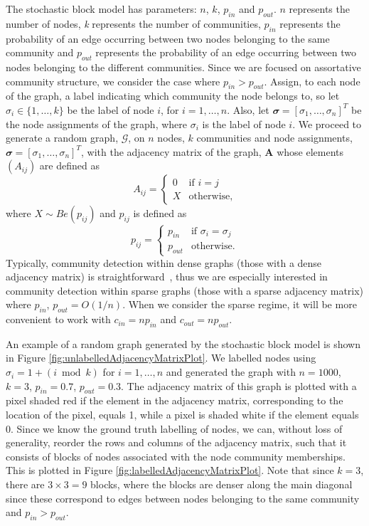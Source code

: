 \documentclass[12pt]{article}
\numberwithin{equation}{section}
\begin{document}
The stochastic block model has parameters: $n$, $k$, $p_{in}$ and $p_{out}$. $n$ represents the number of nodes, \textsl{k} represents the number of communities, $p_{in}$ represents the probability of an edge occurring between two nodes belonging to the same community and $p_{out}$ represents the probability of an edge occurring between two nodes belonging to the different communities. Since we are focused on assortative community structure, we consider the case where $p_{in} > p_{out}$. Assign, to each node of the graph, a label indicating which community the node belongs to, so let $\sigma_{i} \in \{1,\dots,k\}$ be the label of node $i$, for $i = 1,\dots,n$. Also, let $\mathbfit{\sigma} = [\sigma_{1},\dots,\sigma_{n}]^{T}$ be the node assignments of the graph, where $\sigma_{i}$ is the label of node $i$. We proceed to generate a random graph, $\mathcal{G}$, on $n$ nodes, $k$ communities and node assignments, $\mathbfit{\sigma} = [\sigma_{1},\dots,\sigma_{n}]^{T}$, with the adjacency matrix of the graph, $\mathbf{A}$ whose elements $(A_{ij})$ are defined as
\begin{equation*}
	A_{ij} =
	\begin{cases}
		0 & \text{if } i = j\\
		X & \text{otherwise},
	\end{cases}
\end{equation*}
where $X \sim Be(p_{ij})$ and \textsl{$p_{ij}$} is defined as
\begin{equation*}
	p_{ij} =
	\begin{cases}
		p_{in} & \text{if } \sigma_{i} = \sigma_{j}\\
		p_{out} & \text{otherwise}.
	\end{cases}
\end{equation*}
Typically, community detection within dense graphs (those with a dense adjacency matrix) is straightforward~\cite{DKM+13}, thus we are especially interested in community detection within sparse graphs (those with a sparse adjacency matrix) where $p_{in}$, $p_{out} = O(1/n)$. When we consider the sparse regime, it will be more convenient to work with $c_{in} = np_{in}$ and $c_{out} = np_{out}$.

An example of a random graph generated by the stochastic block model is shown in Figure \ref{fig:unlabelledAdjacencyMatrixPlot}. We labelled nodes using $\sigma_{i} = 1 + (i \bmod{k})$ for $i = 1,\dots,n$ and generated the graph with $n = 1000$, $k = 3$, $p_{in} = 0.7$, $p_{out} = 0.3$. The adjacency matrix of this graph is plotted with a pixel shaded red if the element in the adjacency matrix, corresponding to the location of the pixel, equals 1, while a pixel is shaded white if the element equals 0. Since we know the ground truth labelling of nodes, we can, without loss of generality, reorder the rows and columns of the adjacency matrix, such that it consists of blocks of nodes associated with the node community memberships. This is plotted in Figure \ref{fig:labelledAdjacencyMatrixPlot}. Note that since $k = 3$, there are $3 \times 3 = 9$ blocks, where the blocks are denser along the main diagonal since these correspond to edges between nodes belonging to the same community and $p_{in} > p_{out}$.
\end{document}
